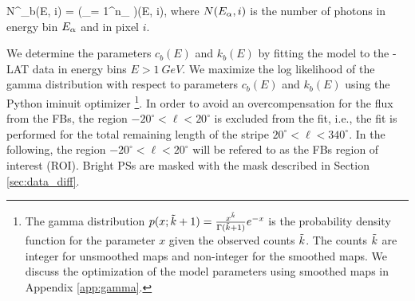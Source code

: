 \be
\tilde N^\low_b(E, i) =  \left(\sum_{\alpha = 1}^{n_\low}  \right)\tau(E, i),
\ee
where $N(E_\alpha, i)$ is the number of photons in energy bin $E_\alpha$ and in pixel $i$.

We determine the parameters $c_{b}(E)$ and $k_{b}(E)$ by fitting the model to the \Fermi-LAT data in energy bins 
$E > \SI{1}{GeV}$.
We maximize the log likelihood of the gamma distribution 
with respect to parameters $c_{b}(E)$ and $k_{b}(E)$
using the Python iminuit optimizer%
\footnote{
The gamma distribution $p(x; \tilde{k} + 1) = \frac{x^{\tilde{k}}}{\Gamma (\tilde{k} + 1)}e^{-x}$ is the probability density function
for the parameter $x$ given the observed counts $\tilde{k}$.
The counts $\tilde{k}$ are integer for unsmoothed maps and non-integer for the smoothed maps.
We discuss the optimization of the model parameters using smoothed maps in 
Appendix \ref{app:gamma}.
}.
In order to avoid an overcompensation 
for the flux from the FBs, the region $-20^\circ < \ell < 20^\circ$
is excluded from the fit, i.e., the fit is performed for 
the total remaining length of the stripe $20^\circ < \ell < 340^\circ$.
In the following, the region $-20^\circ < \ell < 20^\circ$ will be refered to as the FBs region of interest (ROI).
Bright PSs are masked with the mask described in Section \ref{sec:data_diff}.


